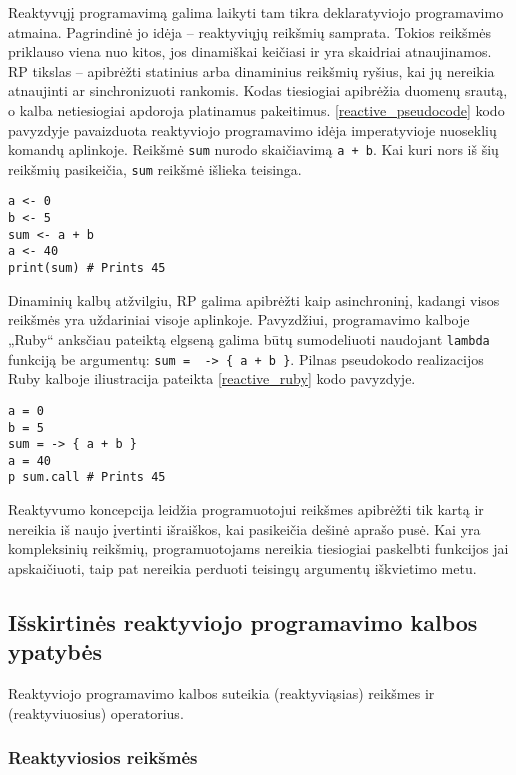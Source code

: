 Reaktyvųjį programavimą galima laikyti tam tikra deklaratyviojo programavimo atmaina. Pagrindinė jo idėja – reaktyviųjų reikšmių samprata. Tokios reikšmės priklauso viena nuo kitos, jos dinamiškai keičiasi ir yra skaidriai atnaujinamos. RP tikslas – apibrėžti statinius arba dinaminius reikšmių ryšius, kai jų nereikia atnaujinti ar sinchronizuoti rankomis. Kodas tiesiogiai apibrėžia duomenų srautą, o kalba netiesiogiai apdoroja platinamus pakeitimus. \ref{reactive_pseudocode} kodo pavyzdyje pavaizduota reaktyviojo programavimo idėja imperatyvioje nuoseklių komandų aplinkoje. Reikšmė \lstinline|sum| nurodo skaičiavimą \lstinline|a + b|. Kai kuri nors iš šių reikšmių pasikeičia, \lstinline|sum| reikšmė išlieka teisinga.

\begin{lstlisting}[caption=Reaktyvaus programavimo pseudokodas, label=reactive_pseudocode]
a <- 0
b <- 5
sum <- a + b
a <- 40
print(sum) # Prints 45
\end{lstlisting}

Dinaminių kalbų atžvilgiu, RP galima apibrėžti kaip asinchroninį, kadangi visos reikšmės yra uždariniai visoje aplinkoje. Pavyzdžiui, programavimo kalboje „Ruby“ anksčiau pateiktą elgseną galima būtų sumodeliuoti naudojant \lstinline|lambda| funkciją be argumentų: \lstinline|sum =  -> { a + b }|. Pilnas pseudokodo realizacijos Ruby kalboje iliustracija pateikta \ref{reactive_ruby} kodo pavyzdyje.

\begin{lstlisting}[caption=Reaktyvaus programavimo pavyzdys Ruby kalboje, label=reactive_ruby]
a = 0
b = 5
sum = -> { a + b }
a = 40
p sum.call # Prints 45
\end{lstlisting}

Reaktyvumo koncepcija leidžia programuotojui reikšmes apibrėžti tik kartą ir nereikia iš naujo įvertinti išraiškos, kai pasikeičia dešinė aprašo pusė. Kai yra kompleksinių reikšmių, programuotojams nereikia tiesiogiai paskelbti funkcijos jai apskaičiuoti, taip pat nereikia perduoti teisingų argumentų iškvietimo metu.

\subsection{Išskirtinės reaktyviojo programavimo kalbos ypatybės}

Reaktyviojo programavimo kalbos suteikia (reaktyviąsias) reikšmes ir (reaktyviuosius) operatorius.

\subsubsection{Reaktyviosios reikšmės}

